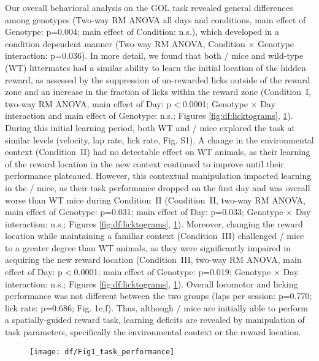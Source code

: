 Our overall behavioral analysis on the GOL task revealed general differences among genotypes (Two-way RM ANOVA all days and conditions, main effect of Genotype: p=0.004; main effect of Condition: n.s.), which developed in a condition dependent manner (Two-way RM ANOVA, Condition $\times$ Genotype interaction: p=0.036). In more detail, we found that both \df/ mice and wild-type (WT) littermates had a similar ability to learn the initial location of the hidden reward, as assessed by the suppression of un-rewarded licks outside of the reward zone and an increase in the fraction of licks within the reward zone (Condition~I, two-way RM ANOVA, main effect of Day: p$<$0.0001; Genotype $\times$ Day interaction and main effect of Genotype: n.s.; Figures \ref{fig:df:licktograms}, \ref{fig:df:task_performance}). During this initial learning period, both WT and \df/ mice explored the task at similar levels (velocity, lap rate, lick rate, Fig. S1). A change in the environmental context (Condition~II) had no detectable effect on WT animals, as their learning of the reward location in the new context continued to improve until their performance plateaued. However, this contextual manipulation impacted learning in the \df/ mice, as their task performance dropped on the first day and was overall worse than WT mice during Condition~II (Condition~II, two-way RM ANOVA, main effect of Genotype: p=0.031; main effect of Day: p=0.033; Genotype $\times$ Day interaction: n.s.; Figures \ref{fig:df:licktograms}, \ref{fig:df:task_performance}). Moreover, changing the reward location while maintaining a familiar context (Condition~III) challenged \df/ mice to a greater degree than WT animals, as they were significantly impaired in acquiring the new reward location (Condition~III, two-way RM ANOVA, main effect of Day: p$<$0.0001; main effect of Genotype: p=0.019; Genotype $\times$ Day interaction: n.s.; Figures \ref{fig:df:licktograms}, \ref{fig:df:task_performance}). Overall locomotor and licking performance was not different between the two groups (laps per session: p=0.770; lick rate: p=0.686; Fig. 1e,f). Thus, although \df/ mice are initially able to perform a spatially-guided reward task, learning deficits are revealed by manipulation of task parameters, specifically the environmental context or the reward location.
\begin{figure}
	\centering
	\texttt{[image: df/Fig1\_task\_performance]}
	\caption{}
	\label{fig:df:task_performance}
\end{figure}

